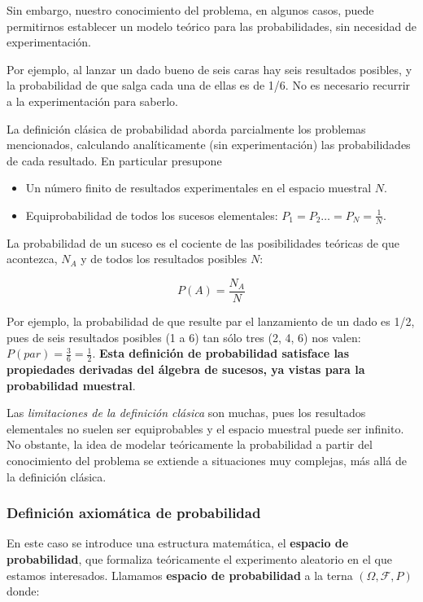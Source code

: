 \documentclass[11pt]{article}
\begin{document}
Sin embargo, nuestro conocimiento del problema, en algunos casos, puede
permitirnos establecer un modelo teórico para las probabilidades, sin
necesidad de experimentación.

Por ejemplo, al lanzar un dado bueno de seis caras hay seis resultados
posibles, y la probabilidad de que salga cada una de ellas es de 1/6. No
es necesario recurrir a la experimentación para saberlo.

    La definición clásica de probabilidad aborda parcialmente los problemas
mencionados, calculando analíticamente (sin experimentación) las
probabilidades de cada resultado. En particular presupone 
\begin{itemize}
\item Un número
finito de resultados experimentales en el espacio muestral \(N\). 
\item Equiprobabilidad de todos los sucesos elementales:
\(P_1 = P_2 \ldots = P_N = \frac{1}{N}\).
\end{itemize}

La probabilidad de un suceso es el cociente de las posibilidades
teóricas de que acontezca, \(N_A\) y de todos los resultados posibles
\(N\):

\[P(A) = \frac{N_A}{N}\]

    Por ejemplo, la probabilidad de que resulte par el lanzamiento de un
dado es 1/2, pues de seis resultados posibles (1 a 6) tan sólo tres (2,
4, 6) nos valen: \(P(par) = \frac{3}{6}=\frac{1}{2}\). \textbf{Esta
definición de probabilidad satisface las propiedades derivadas del
álgebra de sucesos, ya vistas para la probabilidad muestral}.

Las \emph{limitaciones de la definición clásica} son muchas, pues los
resultados elementales no suelen ser equiprobables y el espacio muestral
puede ser infinito. No obstante, la idea de modelar teóricamente la
probabilidad a partir del conocimiento del problema se extiende a
situaciones muy complejas, más allá de la definición clásica.

    \subsubsection*{Definición axiomática de
probabilidad}\label{definiciuxf3n-axiomuxe1tica-de-probabilidad}

En este caso se introduce una estructura matemática, el \textbf{espacio
de probabilidad}, que formaliza teóricamente el experimento aleatorio en
el que estamos interesados. Llamamos \textbf{espacio de probabilidad} a
la terna \((\Omega, \mathscr{F}, P)\) donde:
\end{document}
